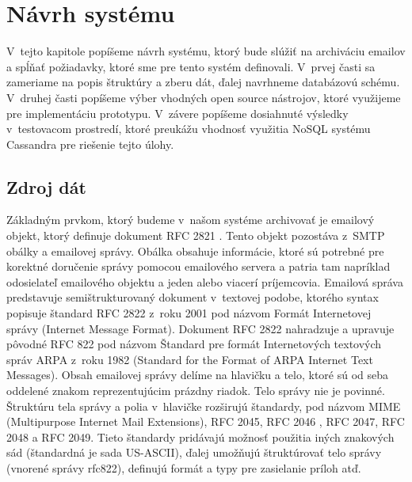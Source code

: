 \documentclass[11pt,twoside,a4paper]{book}
\begin{document}
\chapter{Návrh systému}

V~tejto kapitole popíšeme návrh systému, ktorý bude slúžiť na archiváciu emailov a spĺňať požiadavky, ktoré sme pre tento systém definovali. V~prvej časti sa zameriame na popis štruktúry a zberu dát, ďalej navrhneme databázovú schému. V~druhej časti popíšeme výber vhodných open source nástrojov, ktoré využijeme pre implementáciu prototypu. V~závere popíšeme dosiahnuté výsledky v~testovacom prostredí, ktoré preukážu vhodnosť využitia NoSQL systému Cassandra pre riešenie tejto úlohy.

\section{Zdroj dát}
Základným prvkom, ktorý budeme v~našom systéme archivovať je emailový objekt, ktorý definuje dokument RFC 2821 \cite{Klensin:2001:SMT:RFC2821}. Tento objekt pozostáva z~SMTP obálky a emailovej správy. Obálka obsahuje informácie, ktoré sú potrebné pre korektné doručenie správy pomocou emailového servera a patria tam napríklad odosielateľ emailového objektu a jeden alebo viacerí príjemcovia. Emailová správa predstavuje semištrukturovaný dokument \cite{Udell} v~textovej podobe, ktorého syntax popisuje štandard RFC 2822 \cite{Resnick:2001:IMF:RFC2822} z~roku 2001 pod názvom Formát Internetovej správy (Internet Message Format). Dokument RFC 2822 nahradzuje a upravuje pôvodné RFC 822 pod názvom Štandard pre formát Internetových textových správ ARPA z~roku 1982 (Standard for the Format of ARPA Internet Text Messages). Obsah emailovej správy delíme na hlavičku a telo, ktoré sú od seba oddelené znakom reprezentujúcim prázdny riadok. Telo správy nie je povinné. Štruktúru tela správy a polia v~hlavičke rozširujú štandardy, pod názvom MIME (Multipurpose Internet Mail Extensions), RFC 2045, RFC 2046 \cite{Freed:1996:MIM:RFC2045,Freed:1996:MIM:RFC2046}, RFC 2047, RFC 2048 a RFC 2049. Tieto štandardy pridávajú možnosť použitia iných znakových sád (štandardná je sada US-ASCII), ďalej umožňujú štruktúrovať telo správy (vnorené správy rfc822), definujú formát a typy pre zasielanie príloh atď.
\end{document}
